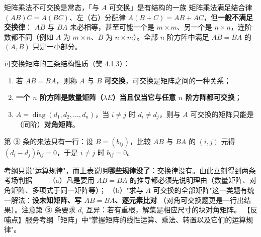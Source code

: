 %



\begin{fdeep}{矩阵乘法不可交换是常态，「与 $A$ 可交换」是有结构的一族}
矩阵乘法满足结合律 $(AB)C=A(BC)$、左（右）分配律 $A(B+C)=AB+AC$，但\textbf{一般不满足交换律}：
$AB$ 与 $BA$ 未必相等，甚至可能一个是 $m\times m$、另一个是 $n\times n$，连阶数都不同（例如
$A$ 为 $m\times n$、$B$ 为 $n\times m$）。全部 $n$ 阶方阵中满足 $AB=BA$ 的 $(A,B)$ 只是一小部分。

可交换矩阵的三条结构性质（樊 4.1.3）：
\begin{enumerate}[leftmargin=2.0em,itemsep=0.2em]
\item 若 $AB=BA$，则称 $A$ 与 $B$ \textbf{可交换}，可交换是矩阵之间的一种关系；
\item \textbf{一个 $n$ 阶方阵是数量矩阵（$\lambda E$）当且仅当它与任意 $n$ 阶方阵都可交换}；
\item $A=\operatorname{diag}(d_1,d_2,\dots,d_n)$，当 $i\ne j$ 时 $d_i\ne d_j$，则与 $A$ 可交换的矩阵只能是（同阶）\textbf{对角矩阵}。
\end{enumerate}
第 ③ 条的来法只有一行：设 $B=(b_{ij})$，比较 $AB$ 与 $BA$ 的 $(i,j)$ 元得
$(d_i-d_j)b_{ij}=0$，于是 $i\ne j$ 时 $b_{ij}=0$。

考纲只说"运算规律"，而上表说明\textbf{哪些规律没了}：交换律没有。由此立刻得到两条考场判据——
（a）凡是要用 $AB=BA$ 的推导都必须先说明理由（数量矩阵、对角矩阵、多项式于同一矩阵等）；
（b）"求与 $A$ 可交换的全部矩阵"这一类题有统一解法：\textbf{设未知矩阵、写 $AB=BA$、逐元素比对}
（对角可交换题更是一行出结果）。注意第 ③ 条要求 $d_i$ 互异：若有重根，解集是相应尺寸的块对角矩阵。
【反哺点】服务考纲「矩阵」中"掌握矩阵的线性运算、乘法、转置以及它们的运算规律"。
\end{fdeep}

